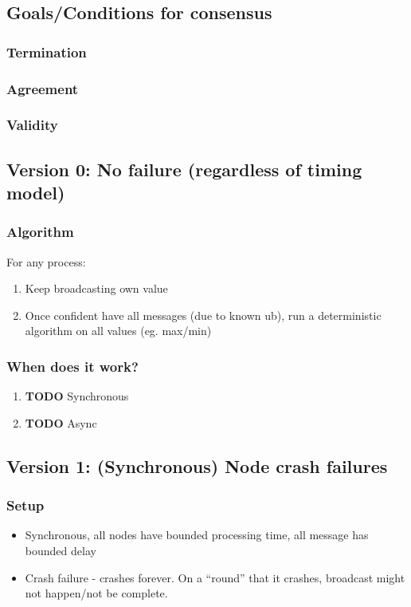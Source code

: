 \documentclass[11pt]{article}
\begin{document}
\subsection{Goals/Conditions for consensus}
\label{sec:org8f3e986}
\subsubsection{Termination}
\label{sec:orgd9b1108}
\subsubsection{Agreement}
\label{sec:orgc5f317e}
\subsubsection{Validity}
\label{sec:orgdf8e550}
\subsection{Version 0: No failure (regardless of timing model)}
\label{sec:org420e9f5}
\subsubsection{Algorithm}
\label{sec:org51a41af}
For any process:
\begin{enumerate}
\item Keep broadcasting own value
\item Once confident have all messages (due to known ub), run a deterministic
algorithm on all values (eg. max/min)
\end{enumerate}
\subsubsection{When does it work?}
\label{sec:org642c527}
\begin{enumerate}
\item {\bfseries\sffamily TODO} Synchronous
\label{sec:org33059bf}
\item {\bfseries\sffamily TODO} Async
\label{sec:org35d7f64}
\end{enumerate}
\subsection{Version 1: (Synchronous) Node crash failures}
\label{sec:org4e01858}
\subsubsection{Setup}
\label{sec:org0d7aee6}
\begin{itemize}
\item Synchronous, all nodes have bounded processing time, all message has bounded
delay
\item Crash failure - crashes forever. On a ``round'' that it crashes, broadcast might
not happen/not be complete.
\end{itemize}
\end{document}
